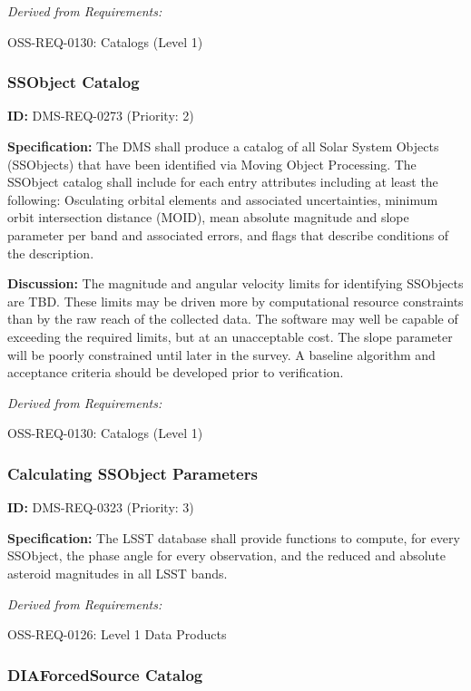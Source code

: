 \documentclass[SE,toc,lsstdraft]{lsstdoc}
\begin{document}
\emph{Derived from Requirements:}

OSS-REQ-0130:
Catalogs (Level 1) \newline

\subsubsection{SSObject Catalog}

\label{DMS-REQ-0273}
\textbf{ID:} DMS-REQ-0273 (Priority: 2)

\textbf{Specification:} The DMS shall produce a catalog of all Solar System Objects (SSObjects) that have been identified via Moving Object Processing. The SSObject catalog shall include for each entry attributes including at least the following: Osculating orbital elements and associated uncertainties, minimum orbit intersection distance (MOID), mean absolute magnitude and slope parameter per band and associated errors, and flags that describe conditions of the description.

\textbf{Discussion: }The magnitude and angular velocity limits for identifying SSObjects are TBD. These limits may be driven more by computational resource constraints than by the raw reach of the collected data. The software may well be capable of exceeding the required limits, but at an unacceptable cost. The slope parameter will be poorly constrained until later in the survey. A baseline algorithm and acceptance criteria should be developed prior to verification.

\emph{Derived from Requirements:}

OSS-REQ-0130:
Catalogs (Level 1) \newline

\subsubsection{Calculating SSObject Parameters}

\label{DMS-REQ-0323}
\textbf{ID:} DMS-REQ-0323 (Priority: 3)

\textbf{Specification:} The LSST database shall provide functions to compute, for every SSObject, the phase angle for every observation, and the reduced and absolute asteroid magnitudes in all LSST bands.

\emph{Derived from Requirements:}

OSS-REQ-0126:
Level 1 Data Products \newline

\subsubsection{DIAForcedSource Catalog}
\end{document}
